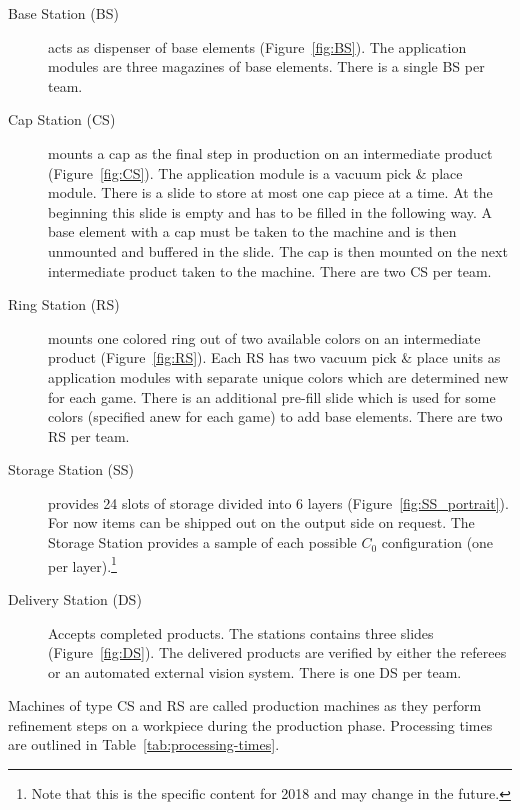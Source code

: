 \documentclass[12pt,twoside]{article}
\newcommand{\reffig}[1]{Figure~\ref{#1}}
\newcommand{\reftab}[1]{Table~\ref{#1}}
\begin{document}
\begin{description}
\item[Base Station (BS)] acts as dispenser of base elements
  (\reffig{fig:BS}). The application modules are three magazines of
  base elements. There is a single BS per team.

\item[Cap Station (CS)] mounts a cap as the final step in production
  on an intermediate product (\reffig{fig:CS}). The application module
  is a vacuum pick \& place module. There is a slide to store at most
  one cap piece at a time. At the beginning this slide is empty and
  has to be filled in the following way.  A base element with a cap
  must be taken to the machine and is then unmounted and buffered in
  the slide. The cap is then mounted on the next intermediate product
  taken to the machine. There are two CS per team.

\item[Ring Station (RS)] mounts one colored ring out of two available
  colors on an intermediate product (\reffig{fig:RS}). Each RS has two
  vacuum pick \& place units as application modules with separate
  unique colors which are determined new for each game. There is an
  additional pre-fill slide which is used for some colors (specified
  anew for each game) to add base elements. There are two RS per team.

\item[Storage Station (SS)] provides 24 slots of storage divided into
  6 layers (\reffig{fig:SS_portrait}). For now items can be  shipped
  out on the output side on request. The Storage Station provides a
  sample of each possible $C_0$ configuration (one per
  layer).\footnote{Note that this is the specific content for 2018 and
  may change in the future.}

\item[Delivery Station (DS)] Accepts completed products. The stations contains
  three slides (\reffig{fig:DS}). The delivered products are verified by either
  the referees or an automated external vision system. There is one DS per team.
\end{description}

\noindent
Machines of type CS and RS are called production machines as they
perform refinement steps on a workpiece during the production
phase. Processing times are outlined in \reftab{tab:processing-times}.
\end{document}
